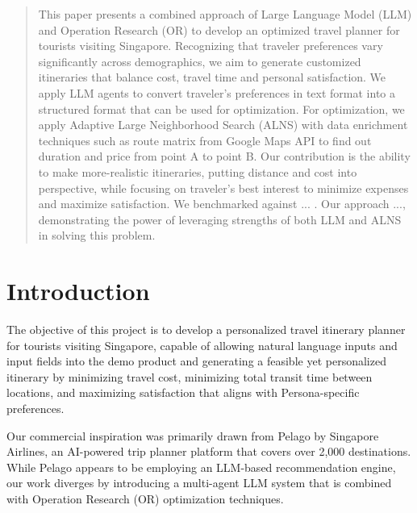 \documentclass{ecai}
\begin{document}
\begin{frontmatter}
\begin{abstract}
This paper presents a combined approach of Large Language Model (LLM) and Operation Research (OR) to develop an optimized travel planner for tourists visiting Singapore. Recognizing that traveler preferences vary significantly across demographics, we aim to generate customized itineraries that balance cost, travel time and personal satisfaction. We apply LLM agents to convert traveler's preferences in text format into a structured format that can be used for optimization. For optimization, we apply Adaptive Large Neighborhood Search (ALNS) with data enrichment techniques such as route matrix from Google Maps API to find out duration and price from point A to point B. Our contribution is the ability to make more-realistic itineraries, putting distance and cost into perspective, while focusing on traveler's best interest to minimize expenses and maximize satisfaction. We benchmarked against ... . Our approach ..., demonstrating the power of leveraging strengths of both LLM and ALNS in solving this problem.

\end{abstract}

\end{frontmatter}


\section{Introduction}
The objective of this project is to develop a personalized travel itinerary planner for tourists visiting Singapore, capable of allowing natural language inputs and input fields into the demo product and generating a feasible yet personalized itinerary by minimizing travel cost, minimizing total transit time between locations, and maximizing satisfaction that aligns with Persona-specific preferences.

Our commercial inspiration was primarily drawn from Pelago by Singapore Airlines, an AI-powered trip planner platform that covers over 2,000 destinations. While Pelago appears to be employing an LLM-based recommendation engine, our work diverges by introducing a multi-agent LLM system that is combined with Operation Research (OR) optimization techniques.
\end{document}
